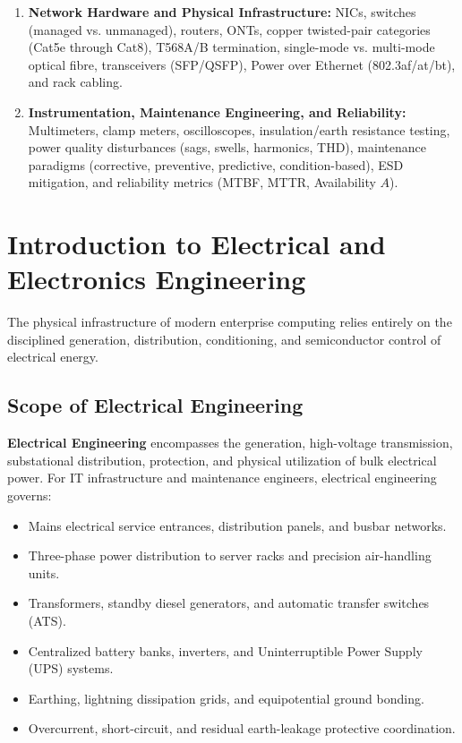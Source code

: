 \begin{enumerate}[label=\bfseries\arabic*.]
    \item \textbf{Network Hardware and Physical Infrastructure:} NICs, switches (managed vs. unmanaged), routers, ONTs, copper twisted-pair categories (Cat5e through Cat8), T568A/B termination, single-mode vs. multi-mode optical fibre, transceivers (SFP/QSFP), Power over Ethernet (802.3af/at/bt), and rack cabling.
    \item \textbf{Instrumentation, Maintenance Engineering, and Reliability:} Multimeters, clamp meters, oscilloscopes, insulation/earth resistance testing, power quality disturbances (sags, swells, harmonics, THD), maintenance paradigms (corrective, preventive, predictive, condition-based), ESD mitigation, and reliability metrics (MTBF, MTTR, Availability $A$).
\end{enumerate}


\section{Introduction to Electrical and Electronics Engineering}
\label{sec:intro_electrical_electronics}

The physical infrastructure of modern enterprise computing relies entirely on the disciplined generation, distribution, conditioning, and semiconductor control of electrical energy.

\subsection{Scope of Electrical Engineering}
\textbf{Electrical Engineering} encompasses the generation, high-voltage transmission, substational distribution, protection, and physical utilization of bulk electrical power. For IT infrastructure and maintenance engineers, electrical engineering governs:
\begin{itemize}
    \item Mains electrical service entrances, distribution panels, and busbar networks.
    \item Three-phase power distribution to server racks and precision air-handling units.
    \item Transformers, standby diesel generators, and automatic transfer switches (ATS).
    \item Centralized battery banks, inverters, and Uninterruptible Power Supply (UPS) systems.
    \item Earthing, lightning dissipation grids, and equipotential ground bonding.
    \item Overcurrent, short-circuit, and residual earth-leakage protective coordination.
\end{itemize}

